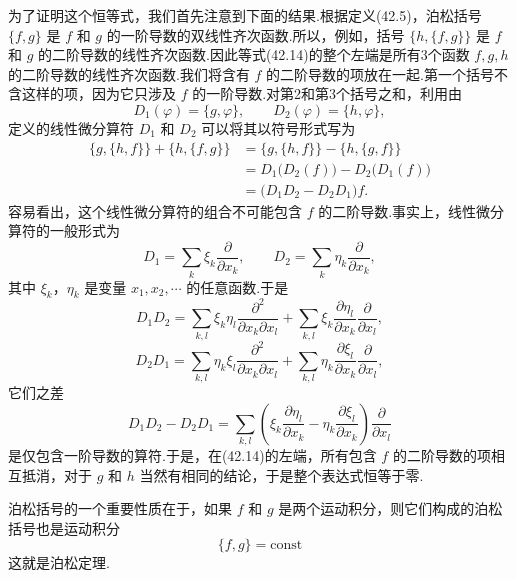 为了证明这个恒等式，我们首先注意到下面的结果.根据定义(42.5)，泊松括号
$\{f,g\}$ 是 $f$ 和 $g$ 的一阶导数的双线性齐次函数.所以，例如，括号
$\{h,\{f,g\}\}$ 是 $f$ 和 $g$ 的二阶导数的线性齐次函数.因此等式(42.14)的整个左端是所有3个函数
$f,g,h$ 的二阶导数的线性齐次函数.我们将含有 $f$
的二阶导数的项放在一起.第一个括号不含这样的项，因为它只涉及 $f$
的一阶导数.对第2和第3个括号之和，利用由
\begin{equation*}
  D_1(\varphi)=\{g,\varphi\},\qquad D_2(\varphi)=\{h,\varphi\},
\end{equation*}
定义的线性微分算符 $D_1$ 和 $D_2$ 可以将其以符号形式写为
\begin{equation*}
\begin{aligned}
  \{g,\{h,f\}\}+\{h,\{f,g\}\}
  &=\{g,\{h,f\}\}-\{h,\{g,f\}\}\\
  &=D_1\bigl(D_2(f)\bigr)-D_2\bigl(D_1(f)\bigr)\\
  &=\bigl(D_1D_2-D_2D_1\bigr)f.
\end{aligned}
\end{equation*}
容易看出，这个线性微分算符的组合不可能包含 $f$
的二阶导数.事实上，线性微分算符的一般形式为
\begin{equation*}
  D_1=\sum_k\xi_k\frac{\partial}{\partial x_k},\qquad
  D_2=\sum_k\eta_k\frac{\partial}{\partial x_k},
\end{equation*}
其中 $\xi_k$，$\eta_k$ 是变量 $x_1,x_2,\cdots$ 的任意函数.于是
\begin{equation*}
  D_1D_2=\sum_{k,l}\xi_k\eta_l\frac{\partial^2}{\partial x_k\partial x_l}
  +\sum_{k,l}\xi_k\frac{\partial\eta_l}{\partial x_k}
  \frac{\partial}{\partial x_l},
\end{equation*}
\begin{equation*}
  D_2D_1=\sum_{k,l}\eta_k\xi_l\frac{\partial^2}{\partial x_k\partial x_l}
  +\sum_{k,l}\eta_k\frac{\partial\xi_l}{\partial x_k}
  \frac{\partial}{\partial x_l},
\end{equation*}
它们之差
\begin{equation*}
  D_1D_2-D_2D_1=\sum_{k,l}\left(\xi_k\frac{\partial\eta_l}{\partial x_k}
  -\eta_k\frac{\partial\xi_l}{\partial x_k}\right)
  \frac{\partial}{\partial x_l}
\end{equation*}
是仅包含一阶导数的算符.于是，在(42.14)的左端，所有包含 $f$
的二阶导数的项相互抵消，对于 $g$ 和 $h$
当然有相同的结论，于是整个表达式恒等于零.

泊松括号的一个重要性质在于，如果 $f$ 和 $g$
是两个运动积分，则它们构成的泊松括号也是运动积分
\begin{equation}
  \{f,g\}=\mathrm{const}
\end{equation}
这就是泊松定理.

